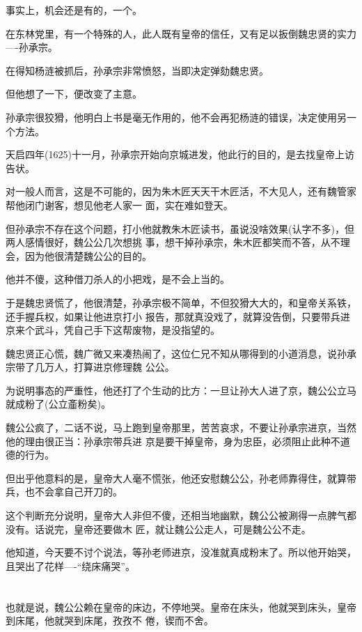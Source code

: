 \documentclass[11pt,a4paper,onecolumn]{article}
\begin{document}
事实上，机会还是有的，一个。

在东林党里，有一个特殊的人，此人既有皇帝的信任，又有足以扳倒魏忠贤的实力----孙承宗。

在得知杨涟被抓后，孙承宗非常愤怒，当即决定弹劾魏忠贤。

但他想了一下，便改变了主意。

孙承宗很狡猾，他明白上书是毫无作用的，他不会再犯杨涟的错误，决定使用另一个方法。

天启四年(1625)十一月，孙承宗开始向京城进发，他此行的目的，是去找皇帝上访告状。

对一般人而言，这是不可能的，因为朱木匠天天干木匠活，不大见人，还有魏管家帮他闭门谢客，想见他老人家一
面，实在难如登天。

但孙承宗不存在这个问题，打小他就教朱木匠读书，虽说没啥效果(认字不多)，但两人感情很好，魏公公几次想挑
事，想干掉孙承宗，朱木匠都笑而不答，从不理会，因为他很清楚魏公公的目的。

他并不傻，这种借刀杀人的小把戏，是不会上当的。

于是魏忠贤慌了，他很清楚，孙承宗极不简单，不但狡猾大大的，和皇帝关系铁，还手握兵权，如果让他进京打小
报告，那就真没戏了，就算没告倒，只要带兵进京来个武斗，凭自己手下这帮废物，是没指望的。

魏忠贤正心慌，魏广微又来凑热闹了，这位仁兄不知从哪得到的小道消息，说孙承宗带了几万人，打算进京修理魏
公公。

为说明事态的严重性，他还打了个生动的比方：一旦让孙大人进了京，魏公公立马就成粉了(公立齑粉矣)。

魏公公疯了，二话不说，马上跑到皇帝那里，苦苦哀求，不要让孙承宗进京，当然他的理由很正当：孙承宗带兵进
京是要干掉皇帝，身为忠臣，必须阻止此种不道德的行为。

但出乎他意料的是，皇帝大人毫不慌张，他还安慰魏公公，孙老师靠得住，就算带兵，也不会拿自己开刀的。

这个判断充分说明，皇帝大人非但不傻，还相当地幽默，魏公公被涮得一点脾气都没有。话说完，皇帝还要做木
匠，就让魏公公走人，可是魏公公不走。

他知道，今天要不讨个说法，等孙老师进京，没准就真成粉末了。所以他开始哭，且哭出了花样----``绕床痛哭''。

\section[\thesection]{}

也就是说，魏公公赖在皇帝的床边，不停地哭。皇帝在床头，他就哭到床头，皇帝到床尾，他就哭到床尾，孜孜不
倦，锲而不舍。
\end{document}
